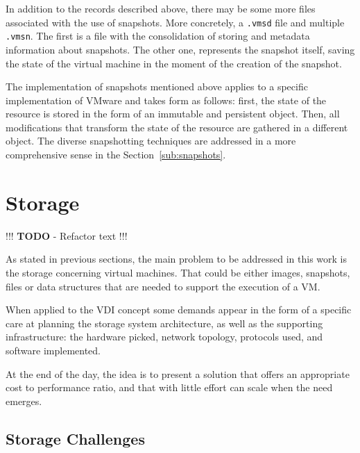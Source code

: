 In addition to the records described above, there may be some more files associated with the use of snapshots. More concretely, a \texttt{.vmsd} file and multiple \texttt{.vmsn}. The first is a file with the consolidation of storing and metadata information about snapshots. The other one, represents the snapshot itself, saving the state of the virtual machine in the moment of the creation of the snapshot.

The implementation of snapshots mentioned above applies to a specific implementation of VMware and takes form as follows: first, the state of the resource is stored in the form of an immutable and persistent object. Then, all modifications that transform the state of the resource are gathered in a different object. 
The diverse snapshotting techniques are addressed in a more comprehensive sense in the Section~\ref{sub:snapshots}.


\section{Storage} %
\label{sec:storage}

!!! \textbf{TODO} - Refactor text !!!

As stated in previous sections, the main problem to be addressed in this work is the storage concerning virtual machines. That could be either images, snapshots, files or data structures that are needed to support the execution of a VM. 

When applied to the VDI concept some demands appear in the form of a specific care at planning the storage system architecture, as well as the supporting infrastructure: the hardware picked, network topology, protocols used, and software implemented.

At the end of the day, the idea is to present a solution that offers an appropriate cost to performance ratio, and that with little effort can scale when the need emerges.


\subsection{Storage Challenges}
\label{sub:storage_challenges}

